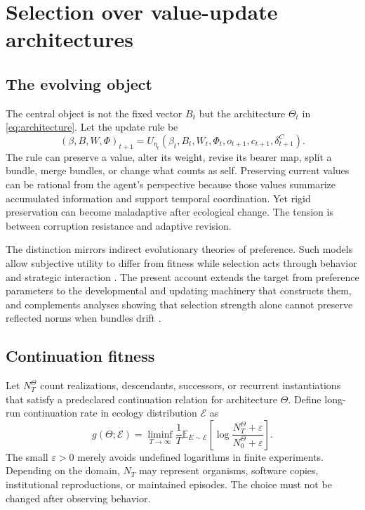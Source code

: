 \documentclass[11pt]{article}
\newcommand{\E}{\mathbb{E}}
\begin{document}
\section{Selection over value-update architectures}

\subsection{The evolving object}

The central object is not the fixed vector $B_t$ but the architecture $\Theta_t$ in \eqref{eq:architecture}. Let the update rule be
\begin{equation}
(\beta,B,W,\Phi)_{t+1}
=
U_{\eta_t}
\left(
\beta_t,B_t,W_t,\Phi_t,
o_{t+1},c_{t+1},\delta^C_{t+1}
\right).
\label{eq:update-rule}
\end{equation}
The rule can preserve a value, alter its weight, revise its bearer map, split a bundle, merge bundles, or change what counts as self. Preserving current values can be rational from the agent's perspective because those values summarize accumulated information and support temporal coordination. Yet rigid preservation can become maladaptive after ecological change. The tension is between corruption resistance and adaptive revision.

The distinction mirrors indirect evolutionary theories of preference. Such models allow subjective utility to differ from fitness while selection acts through behavior and strategic interaction \citep{dekel2007,alger2013}. The present account extends the target from preference parameters to the developmental and updating machinery that constructs them, and complements analyses showing that selection strength alone cannot preserve reflected norms when bundles drift \citep{zarncke2026vbd}.

\subsection{Continuation fitness}

Let $N_T^{\Theta}$ count realizations, descendants, successors, or recurrent instantiations that satisfy a predeclared continuation relation for architecture $\Theta$. Define long-run continuation rate in ecology distribution $\mathcal E$ as
\begin{equation}
g(\Theta;\mathcal E)
=
\liminf_{T\to\infty}
\frac{1}{T}
\E_{E\sim\mathcal E}
\left[
\log\frac{N_T^{\Theta}+\varepsilon}{N_0^{\Theta}+\varepsilon}
\right].
\label{eq:growth-rate}
\end{equation}
The small $\varepsilon>0$ merely avoids undefined logarithms in finite experiments. Depending on the domain, $N_T$ may represent organisms, software copies, institutional reproductions, or maintained episodes. The choice must not be changed after observing behavior.
\end{document}
